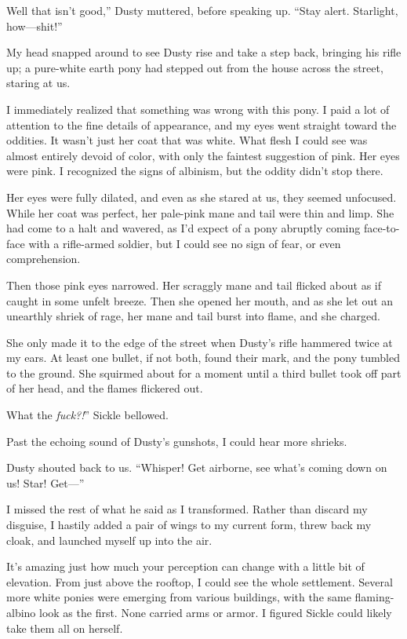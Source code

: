 \leavevmode{}Well that isn’t good,” Dusty muttered, before speaking up. “Stay alert. Starlight, how—shit!”

My head snapped around to see Dusty rise and take a step back, bringing his rifle up; a pure-white earth pony had stepped out from the house across the street, staring at us.

I immediately realized that something was wrong with this pony. I paid a lot of attention to the fine details of appearance, and my eyes went straight toward the oddities. It wasn’t just her coat that was white. What flesh I could see was almost entirely devoid of color, with only the faintest suggestion of pink. Her eyes were pink. I recognized the signs of albinism, but the oddity didn’t stop there.

Her eyes were fully dilated, and even as she stared at us, they seemed unfocused. While her coat was perfect, her pale-pink mane and tail were thin and limp. She had come to a halt and wavered, as I’d expect of a pony abruptly coming face-to-face with a rifle-armed soldier, but I could see no sign of fear, or even comprehension.

Then those pink eyes narrowed. Her scraggly mane and tail flicked about as if caught in some unfelt breeze. Then she opened her mouth, and as she let out an unearthly shriek of rage, her mane and tail burst into flame, and she charged.

She only made it to the edge of the street when Dusty’s rifle hammered twice at my ears. At least one bullet, if not both, found their mark, and the pony tumbled to the ground. She squirmed about for a moment until a third bullet took off part of her head, and the flames flickered out.

\leavevmode{}What the \textit{fuck?!}” Sickle bellowed.

Past the echoing sound of Dusty’s gunshots, I could hear more shrieks.

Dusty shouted back to us. “Whisper! Get airborne, see what’s coming down on us! Star! Get—”

I missed the rest of what he said as I transformed. Rather than discard my disguise, I hastily added a pair of wings to my current form, threw back my cloak, and launched myself up into the air.

It’s amazing just how much your perception can change with a little bit of elevation. From just above the rooftop, I could see the whole settlement. Several more white ponies were emerging from various buildings, with the same flaming-albino look as the first. None carried arms or armor. I figured Sickle could likely take them all on herself.

